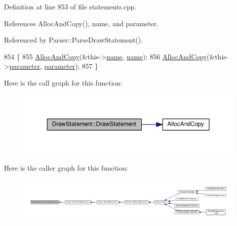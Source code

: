 Definition at line 853 of file statements.\+cpp.



References Alloc\+And\+Copy(), name, and parameter.



Referenced by Parser\+::\+Parse\+Draw\+Statement().


\begin{DoxyCode}
854 \{
855     \hyperlink{clib_8h_a5bed05c70cb17e541fee570b5dc32e1a}{AllocAndCopy}(&this->\hyperlink{classDrawStatement_a3f94d0d8039a4a683bc0631fc27c6f4c}{name}, \hyperlink{classDrawStatement_a3f94d0d8039a4a683bc0631fc27c6f4c}{name});
856     \hyperlink{clib_8h_a5bed05c70cb17e541fee570b5dc32e1a}{AllocAndCopy}(&this->\hyperlink{classDrawStatement_a56f4d974e2408e03e1722c319238e7cf}{parameter}, \hyperlink{classDrawStatement_a56f4d974e2408e03e1722c319238e7cf}{parameter});
857 \}
\end{DoxyCode}


Here is the call graph for this function\+:
\nopagebreak
\begin{figure}[H]
\begin{center}
\leavevmode
\includegraphics[width=350pt]{d3/d82/classDrawStatement_a370abbf650f311ecbcc9ff5faf9a451c_cgraph}
\end{center}
\end{figure}




Here is the caller graph for this function\+:
\nopagebreak
\begin{figure}[H]
\begin{center}
\leavevmode
\includegraphics[width=350pt]{d3/d82/classDrawStatement_a370abbf650f311ecbcc9ff5faf9a451c_icgraph}
\end{center}
\end{figure}



